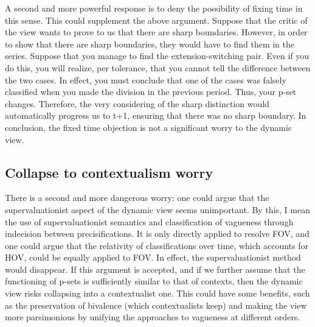 A second and more powerful response is to deny the possibility of fixing
time in this sense. This could supplement the above argument. Suppose
that the critic of the view wants to prove to us that there are sharp
boundaries. However, in order to show that there are sharp boundaries,
they would have to find them in the series. Suppose that you manage to
find the extension-switching pair. Even if you do this, you will
realize, per tolerance, that you cannot tell the difference between the
two cases. In effect, you must conclude that one of the cases was
falsely classified when you made the division in the previous period.
Thus, your p-set changes. Therefore, the very considering of the sharp
distinction would automatically progress us to t+1, ensuring that there
was no sharp boundary. In conclusion, the fixed time objection is not a
significant worry to the dynamic view.

\subsection{Collapse to contextualism worry}

There is a second and more dangerous worry: one could argue that the
supervaluationist aspect of the dynamic view seems unimportant. By this,
I mean the use of supervaluationist semantics and classification of
vagueness through indecision between precisifications. It is only
directly applied to resolve FOV, and one could argue that the relativity
of classifications over time, which accounts for HOV, could be equally
applied to FOV. In effect, the supervaluationist method would disappear.
If this argument is accepted, and if we further assume that the
functioning of p-sets is sufficiently similar to that of contexts, then
the dynamic view risks collapsing into a contextualist one. This could
have some benefits, such as the preservation of bivalence (which
contextualists keep) and making the view more parsimonious by unifying
the approaches to vagueness at different orders.

